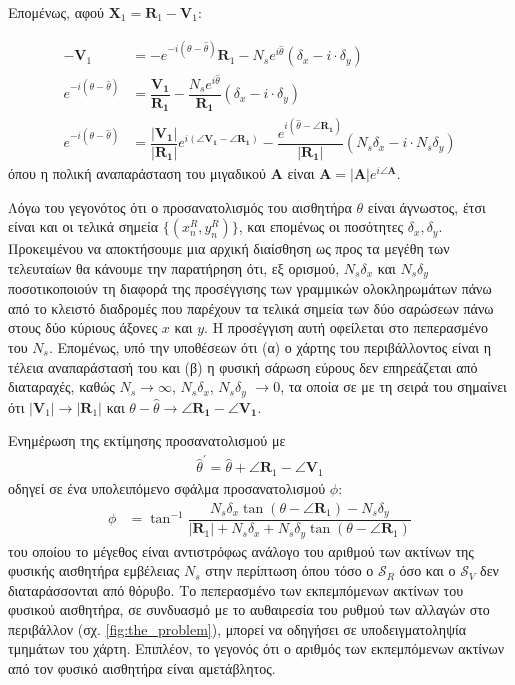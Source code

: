 Επομένως, αφού $\bm{X}_1 = \bm{R}_1 -\bm{V}_1$:

\begin{align}
  -\bm{V}_1 &= -e^{-i(\theta-\hat{\theta})} \bm{R}_1- N_s e^{i\hat{\theta}}(\delta_x - i\cdot \delta_y) \nonumber \\
  e^{-i(\theta-\hat{\theta})} &= \dfrac{\bm{V_1}}{\bm{R_1}} - \dfrac{N_s e^{i\hat{\theta}}}{\bm{R_1}}(\delta_x - i\cdot \delta_y) \nonumber \\
  e^{-i(\theta-\hat{\theta})} &= \dfrac{|\bm{V_1}|}{|\bm{R_1}|} e^{i(\angle \bm{V_1} - \angle \bm{R_1})} - \dfrac{e^{i(\hat{\theta}-\angle \bm{R_1})}}{|\bm{R_1}|} (N_s \delta_x - i\cdot N_s \delta_y) \nonumber
\end{align}
όπου η πολική αναπαράσταση του μιγαδικού $\bm{A}$ είναι
$\bm{A} = |\bm{A}| e^{i\angle \bm{A}}$.

Λόγω του γεγονότος ότι ο προσανατολισμός του αισθητήρα $\theta$ είναι άγνωστος, έτσι είναι και οι
τελικά σημεία $\{(x_n^R,y_n^R)\}$, και επομένως οι ποσότητες $\delta_x, \delta_y$.
Προκειμένου να αποκτήσουμε μια αρχική διαίσθηση ως προς τα μεγέθη των τελευταίων θα
κάνουμε την παρατήρηση ότι, εξ ορισμού, $N_s \delta_x$ και $N_s \delta_y$
ποσοτικοποιούν τη διαφορά της προσέγγισης των γραμμικών ολοκληρωμάτων πάνω από το κλειστό
διαδρομές που παρέχουν τα τελικά σημεία των δύο σαρώσεων πάνω στους δύο κύριους άξονες $x$ και
$y$. Η προσέγγιση αυτή οφείλεται στο πεπερασμένο του $N_s$. Επομένως, υπό την
υποθέσεων ότι (α) ο χάρτης του περιβάλλοντος είναι η τέλεια αναπαράστασή του
και (β) η φυσική σάρωση εύρους δεν επηρεάζεται από διαταραχές, καθώς $N_s
\rightarrow \infty$, $N_s \delta_x$, $N_s \delta_y$ $\rightarrow 0$, τα οποία σε
με τη σειρά του σημαίνει ότι $|\bm{V}_1| \rightarrow |\bm{R}_1|$ και $\theta-\hat{\theta}
\rightarrow \angle \bm{R_1} - \angle \bm{V_1}$.

Ενημέρωση της εκτίμησης προσανατολισμού με
\begin{align}
\hat{\theta}^\prime = \hat{\theta} + \angle \bm{R}_1 - \angle \bm{V}_1
  \label{eq:update_t}
\end{align}
οδηγεί σε ένα υπολειπόμενο σφάλμα προσανατολισμού $\phi$:
\begin{align}
  \phi &= \tan^{-1}\dfrac{N_s \delta_x \tan(\theta - \angle \bm{R}_1) - N_s \delta_y}{|\bm{R}_1| + N_s \delta_x + N_s \delta_y \tan(\theta - \angle \bm{R}_1)} \label{eq:phi}
\end{align}
του οποίου το μέγεθος είναι αντιστρόφως ανάλογο του αριθμού των ακτίνων της φυσικής
αισθητήρα εμβέλειας $N_s$ στην περίπτωση όπου τόσο ο $\mathcal{S}_R$ όσο και ο $\mathcal{S}_V$
δεν διαταράσσονται από θόρυβο. Το πεπερασμένο των εκπεμπόμενων ακτίνων του φυσικού αισθητήρα, σε συνδυασμό με το
αυθαιρεσία του ρυθμού των αλλαγών στο περιβάλλον (σχ.
\ref{fig:the_problem}), μπορεί να οδηγήσει σε υποδειγματοληψία τμημάτων του χάρτη.
Επιπλέον, το γεγονός ότι ο αριθμός των εκπεμπόμενων ακτίνων από τον φυσικό αισθητήρα είναι
αμετάβλητος.


